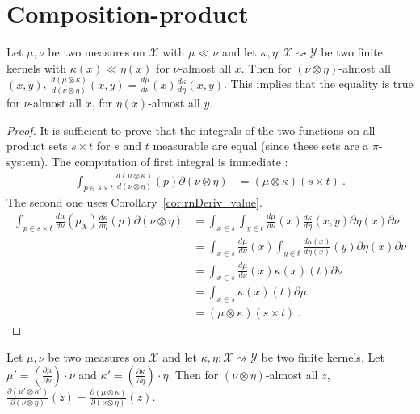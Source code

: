 \section{Composition-product}

\begin{lemma}
  \label{lem:rnDeriv_compProd_aux}
  \leanok
  Let $\mu, \nu$ be two measures on $\mathcal X$ with $\mu \ll \nu$ and let $\kappa, \eta : \mathcal X \rightsquigarrow \mathcal Y$ be two finite kernels with $\kappa(x) \ll \eta(x)$ for $\nu$-almost all $x$. Then for $(\nu \otimes \eta)$-almost all $(x, y)$, $\frac{d (\mu \otimes \kappa)}{d (\nu \otimes \eta)}(x,y) = \frac{d\mu}{d\nu}(x)\frac{d \kappa}{d \eta}(x,y)$.
  This implies that the equality is true for $\nu$-almost all $x$, for $\eta(x)$-almost all $y$.
\end{lemma}

\begin{proof} \leanok
{}
It is sufficient to prove that the integrals of the two functions on all product sets $s \times t$ for $s$ and $t$ measurable are equal (since these sets are a $\pi$-system). The computation of first integral is immediate :
\begin{align*}
\int_{p \in s \times t}\frac{d (\mu \otimes \kappa)}{d (\nu \otimes \eta)}(p) \partial(\nu \otimes \eta)
&= (\mu \otimes \kappa)(s \times t)
\: .
\end{align*}
The second one uses Corollary~\ref{cor:rnDeriv_value}.
\begin{align*}
\int_{p \in s \times t}\frac{d\mu}{d\nu}(p_X) \frac{d \kappa}{d \eta}(p) \partial(\nu \otimes \eta)
&= \int_{x \in s} \int_{y \in t} \frac{d\mu}{d\nu}(x) \frac{d \kappa}{d \eta}(x,y) \partial\eta(x) \partial\nu
\\
&= \int_{x \in s} \frac{d\mu}{d\nu}(x) \int_{y \in t} \frac{d \kappa(x)}{d \eta(x)}(y) \partial\eta(x) \partial\nu
\\
&= \int_{x \in s} \frac{d\mu}{d\nu}(x) \kappa(x)(t) \partial\nu
\\
&= \int_{x \in s} \kappa(x)(t) \partial\mu
\\
&= (\mu \otimes \kappa)(s \times t)
\: .
\end{align*}
\end{proof}

\begin{lemma}
  \label{lem:rnDeriv_eq_ac}
  \leanok
  Let $\mu, \nu$ be two measures on $\mathcal X$ and let $\kappa, \eta : \mathcal X \rightsquigarrow \mathcal Y$ be two finite kernels. Let $\mu' = \left(\frac{\partial \mu}{\partial \nu}\right) \cdot \nu$ and $\kappa' = \left(\frac{\partial \kappa}{\partial \eta}\right) \cdot \eta$. Then for $(\nu \otimes \eta)$-almost all $z$, $\frac{\partial(\mu' \otimes \kappa')}{\partial (\nu \otimes \eta)}(z) = \frac{\partial(\mu \otimes \kappa)}{\partial (\nu \otimes \eta)}(z)$.
\end{lemma}

